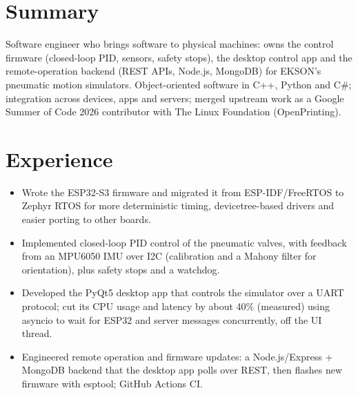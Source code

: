 \documentclass[10pt]{article}
\begin{document}

\section*{Summary}
Software engineer who brings software to physical machines: owns the control firmware (closed-loop PID, sensors, safety stops), the desktop control app and the remote-operation backend (REST APIs, Node.js, MongoDB) for EKSON's pneumatic motion simulators. Object-oriented software in C++, Python and C\#; integration across devices, apps and servers; merged upstream work as a Google Summer of Code 2026 contributor with The Linux Foundation (OpenPrinting).

\section*{Experience}
\begin{itemize}
  \item Wrote the ESP32-S3 firmware and migrated it from ESP-IDF/FreeRTOS to Zephyr RTOS for more deterministic timing, devicetree-based drivers and easier porting to other boards.
  \item Implemented closed-loop PID control of the pneumatic valves, with feedback from an MPU6050 IMU over I2C (calibration and a Mahony filter for orientation), plus safety stops and a watchdog.
  \item Developed the PyQt5 desktop app that controls the simulator over a UART protocol; cut its CPU usage and latency by about 40\% (measured) using asyncio to wait for ESP32 and server messages concurrently, off the UI thread.
  \item Engineered remote operation and firmware updates: a Node.js/Express + MongoDB backend that the desktop app polls over REST, then flashes new firmware with esptool; GitHub Actions CI.
\end{itemize}
\end{document}
